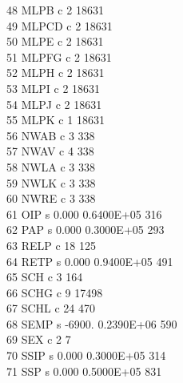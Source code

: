 \documentclass[12pt]{article}
\begin{document}
      48  MLPB       c                                  2     18631\\
      49  MLPCD      c                                  2     18631\\
      50  MLPE       c                                  2     18631\\
      51  MLPFG      c                                  2     18631\\
      52  MLPH       c                                  2     18631\\
      53  MLPI       c                                  2     18631\\
      54  MLPJ       c                                  2     18631\\
      55  MLPK       c                                  1     18631\\
      56  NWAB       c                                  3       338\\
      57  NWAV       c                                  4       338\\
      58  NWLA       c                                  3       338\\
      59  NWLK       c                                  3       338\\
      60  NWRE       c                                  3       338\\
      61  OIP        s    0.000       0.6400E+05                316\\
      62  PAP        s    0.000       0.3000E+05                293\\
      63  RELP       c                                 18       125\\
      64  RETP       s    0.000       0.9400E+05                491\\
      65  SCH        c                                  3       164\\
      66  SCHG       c                                  9     17498\\
      67  SCHL       c                                 24       470\\
      68  SEMP       s   -6900.       0.2390E+06                590\\
      69  SEX        c                                  2         7\\
      70  SSIP       s    0.000       0.3000E+05                314\\
      71  SSP        s    0.000       0.5000E+05                831\\
\end{document}
